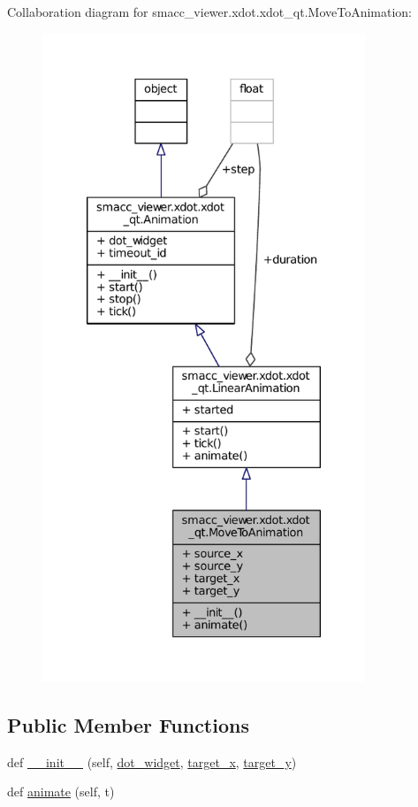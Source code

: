 Collaboration diagram for smacc\+\_\+viewer.\+xdot.\+xdot\+\_\+qt.\+Move\+To\+Animation\+:
\nopagebreak
\begin{figure}[H]
\begin{center}
\leavevmode
\includegraphics[height=550pt]{classsmacc__viewer_1_1xdot_1_1xdot__qt_1_1MoveToAnimation__coll__graph}
\end{center}
\end{figure}
\subsection*{Public Member Functions}
\begin{DoxyCompactItemize}
\item 
def \hyperlink{classsmacc__viewer_1_1xdot_1_1xdot__qt_1_1MoveToAnimation_a5c0b117304079425000a33926ef45b77}{\+\_\+\+\_\+init\+\_\+\+\_\+} (self, \hyperlink{classsmacc__viewer_1_1xdot_1_1xdot__qt_1_1Animation_a8343fc754289769e4199933a2ef8b6c2}{dot\+\_\+widget}, \hyperlink{classsmacc__viewer_1_1xdot_1_1xdot__qt_1_1MoveToAnimation_a7a7a24555d78e358db021b1685d35916}{target\+\_\+x}, \hyperlink{classsmacc__viewer_1_1xdot_1_1xdot__qt_1_1MoveToAnimation_adf69b91918027d26503debdd035b822c}{target\+\_\+y})
\item 
def \hyperlink{classsmacc__viewer_1_1xdot_1_1xdot__qt_1_1MoveToAnimation_ad0a2002a7f8a353483cf5397fcafaec7}{animate} (self, t)
\end{DoxyCompactItemize}
